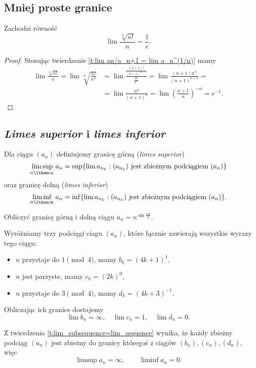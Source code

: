 \subsection{Mniej proste granice}
\begin{theorem}
    Zachodzi równość
    \[ \lim\frac{\sqrt[n]{n!}}{n} = \frac{1}{e}. \]
\end{theorem}
\begin{proof}
    Stosując twierdzenie \ref{t:lim an/a_n+1 = lim a_n^(1/n)} mamy
    \[\begin{aligned} \lim\frac{\sqrt[n]{n!}}{n} = \lim\sqrt[n]{\frac{n!}{n^n}} &= \lim\frac{\frac{(n+1)!}{(n+1)^{n+1}}}{\frac{n!}{n^n}} = \lim\frac{(n+1)n^n}{(n+1)^{n+1}} = \\
        &= \lim\frac{n^n}{(n+1)^n} = \lim\left(\frac{n+1}{n}\right)^{-n} = e^{-1}. \end{aligned}\]
\end{proof}

\subsection{\textit{Limes superior} i \textit{limes inferior}}
\begin{definition}
    Dla ciągu $(a_n)$ definiujemy granicę górną (\textit{limes superior})
    \[ \limsup_{n \lthen \infty} a_n = \sup\{\lim a_{n_k} : (a_{n_k}) \text{ jest zbieżnym podciągiem } (a_n)\} \]
    oraz granicę dolną (\textit{limes inferior})
    \[ \liminf_{n \lthen \infty} a_n = \inf\{\lim a_{n_k} : (a_{n_k}) \text{ jest zbieżnym podciągiem } (a_n)\}. \]
\end{definition}

\begin{example}
    Obliczyć granicę górną i dolną ciągu $a_n = n^{\sin\frac{n\pi}{2}}$.
\end{example}
\begin{solution}
    Wyróżniamy trzy podciągi ciagu $(a_n)$, które łącznie zawierają wszystkie wyrazy tego ciągu:
    \begin{itemize}
        \item $n$ przystaje do $1 \pmod{4}$, mamy $b_k = (4k + 1)^1$,
        \item $n$ jest parzyste, mamy $c_k = (2k)^0$,
        \item $n$ przystaje do $3 \pmod{4}$, mamy $d_k = (4k + 3)^{-1}$.
    \end{itemize}

    Obliczając ich granice dostajemy
    \[ \lim b_n = \infty, \quad \lim c_n = 1, \quad \lim d_n = 0. \]

    Z twierdzenia \ref{t:lim_subsequence=lim_sequence} wynika, że każdy zbieżny podciąg $(a_n)$ jest zbieżny do granicy któregoś z ciągów $(b_n), (c_n), (d_n)$, więc
    \[ \limsup a_n = \infty, \qquad \liminf a_n = 0. \]
\end{solution}